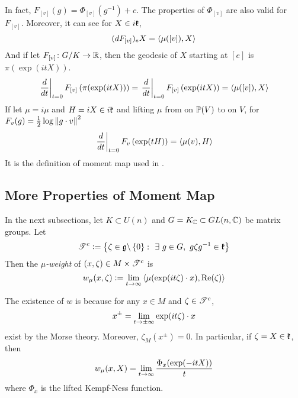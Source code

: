 \documentclass[a4paper,12pt]{article}
\begin{document}
\begin{exam}
\begin{rem}
\begin{equation*}
			\end{equation*}
			In fact, $F_{[v]}(g) = \Phi_{[v]}(g^{-1}) + c$. The properties of $\Phi_{[v]}$ are also valid for $F_{[v]}$. Moreover, it can see for $X \in i\mathfrak{k}$,
			\begin{equation*}
				(dF_{[v]})_eX = \left\langle \mu([v]),X \right\rangle
			\end{equation*}
			And if let $F_{[v]}  \colon G /K \rightarrow \mathbb{R}$, then the geodesic of $X$ starting at $[e]$ is $\pi(\exp(itX))$.
			\begin{equation*}
				\left.\frac{d}{dt}\right\lvert_{t=0}F_{[v]}\left(\pi(\exp(itX))\right) =\left.\frac{d}{dt}\right\lvert_{t=0}F_{[v]}\left(\exp(itX)\right) = \left\langle \mu([v]),X \right\rangle
			\end{equation*}
			If let $\mu = i\mu$ and $H=iX \in i\mathfrak{k}$ and lifting $\mu$ from on $\mathbb{P}(V)$ to on $V$, for $F_v(g) =\frac{1}{2} \log\left\lVert g \cdot v\right\lVert^2$
			\begin{equation*}
				\left.\frac{d}{dt}\right\lvert_{t=0}F_{v}\left(\exp(tH)\right) = \left\langle \mu(v),H \right\rangle
			\end{equation*}
			It is the definition of moment map used in \cite{key9}.
		\end{rem}
	\end{exam}

	\subsection{More Properties of Moment Map}

	In the next subsections, let $K \subset U(n)$ and $G=K_{\mathbb{C}} \subset GL(n,\mathbb{C})$ be matrix groups. Let
	\begin{equation*}
		\mathscr{T}^c \vcentcolon= \left\{\zeta \in \mathfrak{g} \backslash \left\{0\right\} \colon ~\exists~ g \in G,~g\zeta g^{-1} \in \mathfrak{k}\right\}
	\end{equation*}
	Then the \emph{$\mu$-weight} of $(x,\zeta) \in M \times \mathscr{T}^c$ is 
	\begin{equation*}
		w_{\mu}(x,\zeta) \vcentcolon= \lim_{t \rightarrow \infty} \left\langle \mu(\exp(it\zeta) \cdot x),\operatorname{Re}(\zeta) \right\rangle
	\end{equation*}
	\begin{rem}
		The existence of $w$ is because for any $x \in M$ and $\zeta \in \mathscr{T}^c$,
		\begin{equation*}
			x^{\pm} = \lim_{t \rightarrow \pm \infty} \exp(it\zeta)\cdot x
		\end{equation*}
		exist by the Morse theory. Moreover, $\zeta_M(x^{\pm}) = 0$. In particular, if $\zeta = X \in \mathfrak{k}$, then
		\begin{equation*}
			w_{\mu}(x,X) = \lim_{t \rightarrow \infty} \frac{\Phi_x(\exp(-itX))}{t}
		\end{equation*}
		where $\Phi_x$ is the lifted Kempf-Ness function.
	\end{rem}
\end{document}
